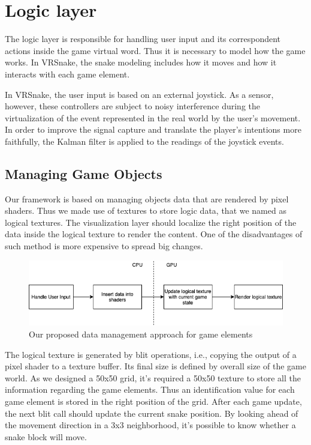 \documentclass[runningheads]{llncs}
\begin{document}
\section{Logic layer}
\label{sec:logic-layer}

The logic layer is responsible for handling user input and its correspondent actions inside the game virtual word. Thus it is necessary to model how the game works. In VRSnake, the snake modeling includes how it moves and how it interacts with each game element.

In VRSnake, the user input is based on an external joystick. As a sensor, however, these controllers are subject to noisy interference during the virtualization of the event represented in the real world by the user's movement. In order to improve the signal capture and translate the player's intentions more faithfully, the Kalman filter \cite{WelchBishop} is applied to the readings of the joystick events.


\subsection{Managing Game Objects}

Our framework is based on managing objects data that are rendered by pixel shaders. Thus we made use of textures to store logic data, that we named as logical textures.
The visualization layer should localize the right position of the data inside the logical texture to render the content. One of the disadvantages of such method is more expensive to spread big changes.

\begin{figure}[h]
\centering
\includegraphics[width=\textwidth]{hci2020-paper/images/VRSnake_GameObjectData_Management.png}
\caption{Our proposed data management approach for game elements}
\label{fig:VR_GameObjectData_Management}
\end{figure}

The logical texture is generated by blit operations, i.e., copying the output of a pixel shader to a texture buffer. Its final size is defined by overall size of the game world. As we designed a 50x50 grid, it's required a 50x50 texture to store all the information regarding the game elements. Thus an identification value for each game element is stored in the right position of the grid. After each game update, the next blit call should update the current snake position. By looking ahead of the movement direction in a 3x3 neighborhood, it's possible to know whether a snake block will move.
\end{document}
